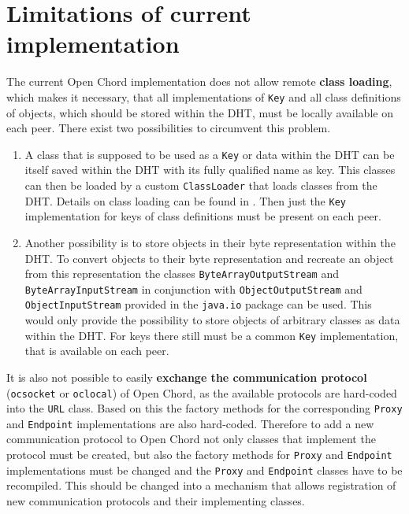 \section{Limitations of current implementation}

The current Open Chord implementation does not allow remote {\bf class loading}, 
which makes it necessary, that all implementations of {\tt Key} and all 
class definitions of objects, which should be stored within the DHT, must 
be locally available on each peer. There exist two possibilities to circumvent 
this problem. 
\begin{enumerate}
%
\item A class that is supposed to be used as a {\tt Key} or data within the DHT 
can be itself saved within the DHT with its fully qualified name as key. This 
classes can then be loaded by a custom {\tt ClassLoader} that loads classes 
from the DHT. Details on class loading can be found in \cite{christudas05internals}. 
Then just the {\tt Key} implementation for keys of class definitions must be 
present on each peer. 
%
\item Another possibility is to store objects in their byte representation 
within the DHT. To convert objects to their byte representation and 
recreate an object from this representation the classes {\tt ByteArrayOutputStream}
and {\tt ByteArrayInputStream} in conjunction with {\tt Object\-Output\-Stream} and 
{\tt ObjectInputStream} provided in the {\tt java.io} package can be used. 
This would only provide the possibility to store objects of arbitrary classes 
as data within the DHT. For keys there still must be a common {\tt Key} 
implementation, that is available on each peer. 
%
\end{enumerate}

It is also not possible to easily {\bf exchange the communication protocol} 
({\tt ocsocket}
or {\tt oclocal}) of Open Chord, as the available protocols are hard-coded into 
the {\tt URL} class. Based on this the factory methods for the corresponding 
{\tt Proxy} and {\tt Endpoint} implementations are also hard-coded. Therefore to 
add a new communication protocol to Open Chord not only classes that implement the 
protocol must be created, but also the factory methods for {\tt Proxy} and 
{\tt Endpoint} implementations must be changed and the {\tt Proxy} and 
{\tt Endpoint} classes have to be recompiled. This should be changed into a mechanism 
that allows registration of new communication protocols and their implementing classes.

